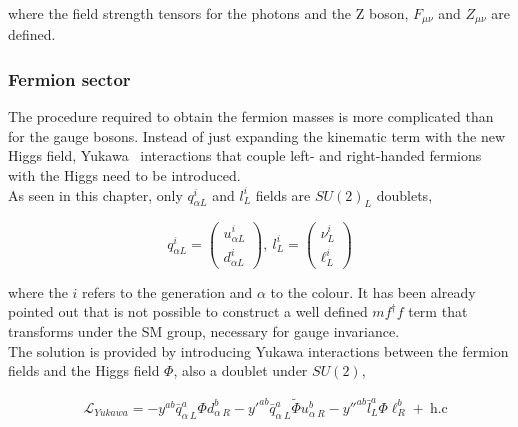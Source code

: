 where the field strength tensors for the photons and the Z boson, $F_{\mu\nu}$ and $Z_{\mu\nu}$ are defined.

\subsubsection{Fermion sector}

The procedure required to obtain the fermion masses is more complicated than for the gauge bosons. Instead of just expanding the kinematic term with the new Higgs field, Yukawa~\cite{yukawa} interactions that couple left- and right-handed fermions with the Higgs need to be introduced.\\

As seen in this chapter, only $q_{\alpha L}^i$ and $l^i_L$ fields are $SU(2)_L$ doublets,

\begin{equation}
    \label{Theory_eq:SUdoublets}
    q_{\alpha L}^i=\begin{pmatrix} u^i_{\alpha L} \\ d^i_{\alpha L} \end{pmatrix},\ l_L^i = \begin{pmatrix} \nu^i_L \\ \ell^i_L \end{pmatrix}
\end{equation}

where the $i$ refers to the generation and $\alpha$ to the colour. It has been already pointed out that is not possible to construct a well defined $mf^\dag f$ term that transforms under the SM group, necessary for gauge invariance.\\

The solution is provided by introducing Yukawa interactions between the fermion fields and the Higgs field $\Phi$, also a doublet under $SU(2)$,

\begin{equation}
\begin{split}
    &\mathcal{L}_{Yukawa} = -y^{ab}\bar{q}^a_{\alpha\ L}\Phi d^b_{\alpha\ R} - y'^{ab}\bar{q}^a_{\alpha\ L}\tilde{\Phi} u^b_{\alpha\ R}-y''^{ab}\bar{l}^a_{L}\Phi \ell^b_{R}+\ \text{h.c}\\
\end{split}
\end{equation}

